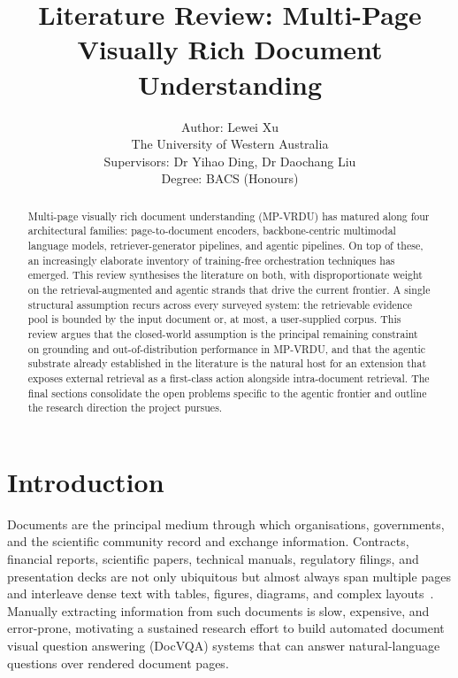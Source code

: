 \documentclass[11pt]{article}
\title{Literature Review: Multi-Page Visually Rich Document Understanding}
\author{Author: Lewei Xu \\
  The University of Western Australia \\
  Supervisors: Dr Yihao Ding, Dr Daochang Liu \\
  Degree: BACS (Honours) \\}
\begin{document}
\maketitle
\begin{abstract}
Multi-page visually rich document understanding (MP-VRDU) has matured along four architectural families: page-to-document encoders, backbone-centric multimodal language models, retriever-generator pipelines, and agentic pipelines. On top of these, an increasingly elaborate inventory of training-free orchestration techniques has emerged. This review synthesises the literature on both, with disproportionate weight on the retrieval-augmented and agentic strands that drive the current frontier. A single structural assumption recurs across every surveyed system: the retrievable evidence pool is bounded by the input document or, at most, a user-supplied corpus. This review argues that the closed-world assumption is the principal remaining constraint on grounding and out-of-distribution performance in MP-VRDU, and that the agentic substrate already established in the literature is the natural host for an extension that exposes external retrieval as a first-class action alongside intra-document retrieval. The final sections consolidate the open problems specific to the agentic frontier and outline the research direction the project pursues.
\end{abstract}

\section{Introduction}

Documents are the principal medium through which organisations, governments, and the scientific community record and exchange information. Contracts, financial reports, scientific papers, technical manuals, regulatory filings, and presentation decks are not only ubiquitous but almost always span multiple pages and interleave dense text with tables, figures, diagrams, and complex layouts~\cite{tito2023hierarchical,borchmann2025arctic}. Manually extracting information from such documents is slow, expensive, and error-prone, motivating a sustained research effort to build automated document visual question answering (DocVQA) systems that can answer natural-language questions over rendered document pages.
\end{document}
